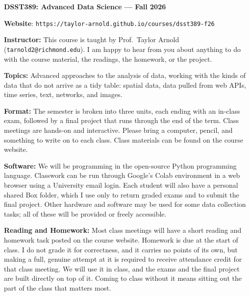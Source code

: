 \documentclass[11pt, a4paper]{article}
\begin{document}
\begin{center}
\textbf{DSST389: Advanced Data Science --- Fall 2026}
\end{center}

\vspace{0.5cm}

\textbf{Website}: \texttt{https://taylor-arnold.github.io/courses/dsst389-f26}

\bigskip

\textbf{Instructor:}
This course is taught by Prof.~Taylor Arnold (\texttt{tarnold2@richmond.edu}). I am happy to hear from you about anything to do with the course material, the readings, the homework, or the project.

\bigskip

\textbf{Topics:}
Advanced approaches to the analysis of data, working with the kinds of data that do not arrive as a tidy table: spatial data, data pulled from web APIs, time series, text, networks, and images.

\bigskip

\textbf{Format:}
The semester is broken into three units, each ending with an in-class exam, followed by a final project that runs through the end of the term. Class meetings are hands-on and interactive. Please bring a computer, pencil, and something to write on to each class. Class materials can be found on the course website.

\bigskip

\textbf{Software:}
We will be programming in the open-source Python programming language. Classwork can be run through Google's Colab environment in a web browser using a University email login. Each student will also have a personal shared Box folder, which I use only to return graded exams and to submit the final project. Other hardware and software may be used for some data collection tasks; all of these will be provided or freely accessible.

\bigskip

\textbf{Reading and Homework:}
Most class meetings will have a short reading and homework task posted on the course website. Homework is due at the start of class. I do not grade it for correctness, and it carries no points of its own, but making a full, genuine attempt at it is required to receive attendance credit for that class meeting. We will use it in class, and the exams and the final project are built directly on top of it. Coming to class without it means sitting out the part of the class that matters most.
\end{document}
